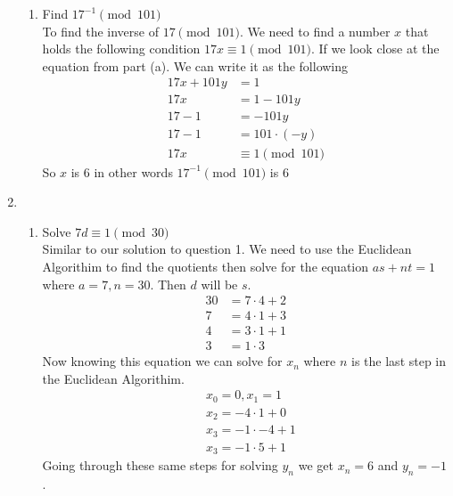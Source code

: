 \documentclass[12pt]{article}
\begin{document}
\begin{enumerate}
\begin{enumerate}
              \item Find $17^{-1} \pmod{101}$\\
                    To find the inverse of $17 \pmod{101}$. We need to find a number $x$ that holds the following condition $17x \equiv 1 \pmod{101}$. If we look close at the equation from part (a). We can write it as the following\begin{align*}
                        17x +101y &=1\\
                        17x&= 1-101y\\
                        17-1&= -101y\\
                        17 - 1& = 101\cdot(-y)\\
                        17x &\equiv 1 \pmod{101}
                    \end{align*}
                    So $x$ is 6 in other words $17^{-1} \pmod{101}$ is 6
          \end{enumerate}
          \newpage
          \item \begin{enumerate}
              \item Solve $7d \equiv 1 \pmod{30}$\\
              Similar to our solution to question 1. We need to use the Euclidean Algorithim to find the quotients then solve for the equation $as+nt =1$ where $a = 7, n=30$. Then $d$ will be $s$.
              \begin{align*}
                30 &= 7 \cdot 4 +2\\
                7 &= 4 \cdot 1 +3\\
                4 &=3 \cdot 1 +1\\
                3 &=1 \cdot 3    
              \end{align*}
              Now knowing this equation we can solve for $x_n$ where $n$ is the last step in the Euclidean Algorithim.
                    \begin{align*}
                         & x_0 = 0, x_1 =1        \\
                         & x_2 = -4 \cdot 1 + 0  \\
                         & x_3 = -1 \cdot -4 + 1\\
                         & x_3 = -1 \cdot 5 + 1
                    \end{align*}
                    Going through these same steps for solving $y_n$ we get $x_n=6$ and $y_n = -1$.
          \end{enumerate}
\end{enumerate}
\end{document}
